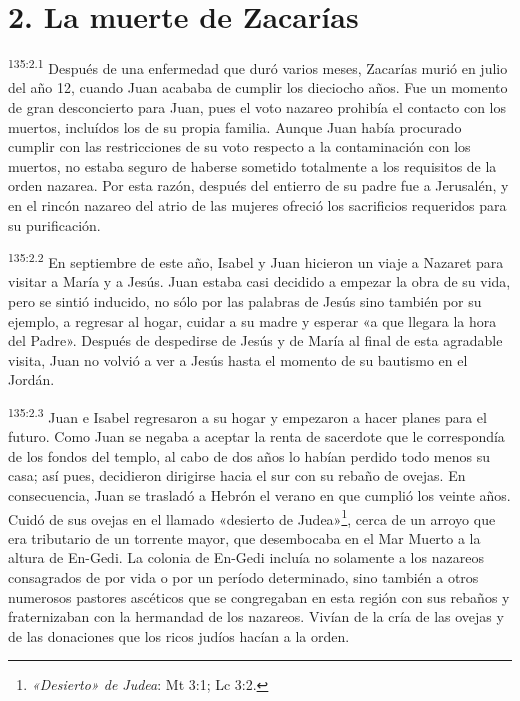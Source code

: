 \section*{2. La muerte de Zacarías}
\par 
\textsuperscript{135:2.1} Después de una enfermedad que duró varios meses, Zacarías murió en julio del año 12, cuando Juan acababa de cumplir los dieciocho años. Fue un momento de gran desconcierto para Juan, pues el voto nazareo prohibía el contacto con los muertos, incluídos los de su propia familia. Aunque Juan había procurado cumplir con las restricciones de su voto respecto a la contaminación con los muertos, no estaba seguro de haberse sometido totalmente a los requisitos de la orden nazarea. Por esta razón, después del entierro de su padre fue a Jerusalén, y en el rincón nazareo del atrio de las mujeres ofreció los sacrificios requeridos para su purificación.

\par 
\textsuperscript{135:2.2} En septiembre de este año, Isabel y Juan hicieron un viaje a Nazaret para visitar a María y a Jesús. Juan estaba casi decidido a empezar la obra de su vida, pero se sintió inducido, no sólo por las palabras de Jesús sino también por su ejemplo, a regresar al hogar, cuidar a su madre y esperar «a que llegara la hora del Padre». Después de despedirse de Jesús y de María al final de esta agradable visita, Juan no volvió a ver a Jesús hasta el momento de su bautismo en el Jordán.

\par 
\textsuperscript{135:2.3} Juan e Isabel regresaron a su hogar y empezaron a hacer planes para el futuro. Como Juan se negaba a aceptar la renta de sacerdote que le correspondía de los fondos del templo, al cabo de dos años lo habían perdido todo menos su casa; así pues, decidieron dirigirse hacia el sur con su rebaño de ovejas. En consecuencia, Juan se trasladó a Hebrón el verano en que cumplió los veinte años. Cuidó de sus ovejas en el llamado «desierto de Judea»\footnote{\textit{«Desierto» de Judea}: Mt 3:1; Lc 3:2.}, cerca de un arroyo que era tributario de un torrente mayor, que desembocaba en el Mar Muerto a la altura de En-Gedi. La colonia de En-Gedi incluía no solamente a los nazareos consagrados de por vida o por un período determinado, sino también a otros numerosos pastores ascéticos que se congregaban en esta región con sus rebaños y fraternizaban con la hermandad de los nazareos. Vivían de la cría de las ovejas y de las donaciones que los ricos judíos hacían a la orden.

